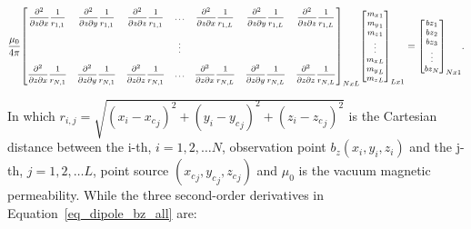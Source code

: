\begin{equation}
\footnotesize
\label{eq_dipole_bz_all}
\dfrac{\mu_0}{4\pi}
{\begin{bmatrix}
\dfrac{\partial^2}{\partial z \partial x} \dfrac{1}{r_{1,1}}
& \dfrac{\partial^2}{\partial z \partial y} \dfrac{1}{r_{1,1}}
& \dfrac{\partial^2}{\partial z \partial z} \dfrac{1}{r_{1,1}}
& \hdots
& \dfrac{\partial^2}{\partial z \partial x} \dfrac{1}{r_{1,L}}
& \dfrac{\partial^2}{\partial z \partial y} \dfrac{1}{r_{1,L}}
& \dfrac{\partial^2}{\partial z \partial z} \dfrac{1}{r_{1,L}} \\
\\

& 
& 
& \vdots
& 
& 
&  \\
\\
\dfrac{\partial^2}{\partial z \partial x} \dfrac{1}{r_{N,1}}
& \dfrac{\partial^2}{\partial z \partial y} \dfrac{1}{r_{N,1}}
& \dfrac{\partial^2}{\partial z \partial z} \dfrac{1}{r_{N,1}}
& \hdots
& \dfrac{\partial^2}{\partial z \partial x} \dfrac{1}{r_{N,L}}
& \dfrac{\partial^2}{\partial z \partial y} \dfrac{1}{r_{N,L}}
& \dfrac{\partial^2}{\partial z \partial z} \dfrac{1}{r_{N,L}} \\
\end{bmatrix}}_{N x L}
{\begin{bmatrix}
{m_x}_1 \\ {m_y}_1 \\ {m_z}_1 \\ \vdots \\{m_x}_L \\ {m_y}_L \\ {m_z}_L \\
\end{bmatrix}}_{L x 1}
=
{\begin{bmatrix}
{bz}_1 \\ {bz}_2 \\ {bz}_3 \\ \vdots \\{bz}_N 
\end{bmatrix}}_{N x 1}.
\end{equation} \bigskip

In which $r_{i,j} = \sqrt{(x_i - {x_c}_j)^2 + (y_i - {y_c}_j)^2 + (z_i - {z_c}_j)^2}$ is the Cartesian distance between the i-th, $i=1, 2, \hdots N$, observation point $b_z (x_i, y_i, z_i)$ and the j-th, $j=1, 2, \hdots L$, point source $({x_c}_j, {y_c}_j, {z_c}_j)$ and $\mu_0$ is the vacuum magnetic permeability. While the three second-order derivatives in Equation~\ref{eq_dipole_bz_all} are:


